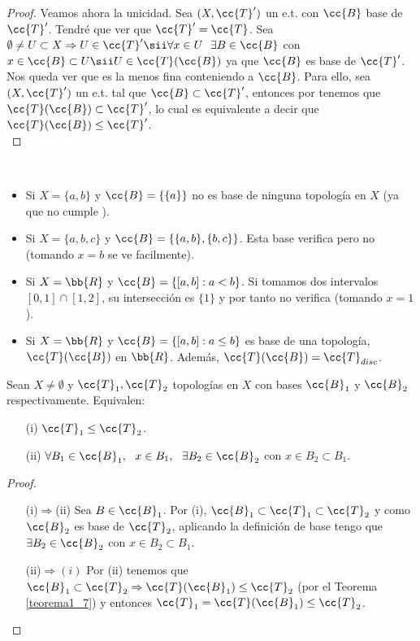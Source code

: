 \begin{teo}
\begin{proof}
        Veamos ahora la unicidad. Sea $(X, \cc{T}')$ un e.t. con $\cc{B}$ base de $\cc{T}'$. Tendré que ver que $\cc{T}'=\cc{T}$. Sea $\emptyset\neq U\subset X \Rightarrow U\in \cc{T}'\sii \forall x \in U\ \ \exists B\in \cc{B}$ con $x\in \cc{B}\subset U \sii U\in \cc{T}(\cc{B})$ ya que $\cc{B}$ es base de $\cc{T}'$.\\

        Nos queda ver que es la menos fina conteniendo a $\cc{B}$. Para ello, sea $(X,\cc{T}')$ un e.t. tal que $\cc{B}\subset \cc{T}'$, entonces por  tenemos que $\cc{T}(\cc{B})\subset \cc{T}'$, lo cual es equivalente a decir que $\cc{T}(\cc{B})\leq \cc{T}'$.\\
    \end{proof}
\end{teo}

\begin{ejemplo}\
    \begin{itemize}
        \item Si $X=\{a,b\}$ y $\cc{B}=\{\{a\}\}$ no es base de ninguna topología en $X$ (ya que no cumple ).
        \item Si $X=\{a,b,c\}$ y $\cc{B}=\{\{a,b\},\{b,c\}\}$. Esta base verifica \apuntar{B1} pero no  (tomando $x=b$ se ve facilmente). %
        \item Si $X=\bb{R}$ y $\cc{B}=\{[a,b]:a<b\}$. Si tomamos dos intervalos $[0,1]\cap [1,2]$, su intersección es $\{1\}$ y por tanto no verifica \apuntar{B2} (tomando $x=1$).
        \item Si $X=\bb{R}$ y $\cc{B}=\{[a,b]:a\leq b\}$ es base de una topología, $\cc{T}(\cc{B})$ en $\bb{R}$. Además, $\cc{T}(\cc{B})=\cc{T}_{disc}$.
    \end{itemize}
    \endsquare
\end{ejemplo}

\begin{prop}
    Sean $X\neq \emptyset$ y $\cc{T}_1, \cc{T}_2$ topologías en $X$ con bases $\cc{B}_1$ y $\cc{B}_2$ respectivamente. Equivalen:
    \begin{enumerate}
        \item[(i)] $\cc{T}_1\leq \cc{T}_2$.
        \item[(ii)] $\forall B_1 \in \cc{B}_1,\ \ x \in B_1,\ \ \exists B_2 \in \cc{B}_2$ con $x\in B_2 \subset B_1$.
    \end{enumerate}
    \begin{proof}\
        \begin{enumerate}
            \item[(i)$\Rightarrow$(ii)] Sea $B \in \cc{B}_1$. Por (i), $\cc{B}_1 \subset \cc{T}_1 \subset \cc{T}_2$ y como $\cc{B}_2$ es base de $\cc{T}_2$, aplicando la definición de base tengo que $\exists B_2 \in \cc{B}_2$ con $x\in B_2 \subset B_1$.
            \item[(ii)$\Rightarrow (i)$] Por (ii) tenemos que $\cc{B}_1\subset \cc{T}_2\Rightarrow \cc{T}(\cc{B}_1)\leq \cc{T}_2$ (por el Teorema \ref{teorema1_7})
             y entonces $\cc{T}_1=\cc{T}(\cc{B}_1)\leq \cc{T}_2$.
        \end{enumerate}
    \end{proof}
\end{prop}

